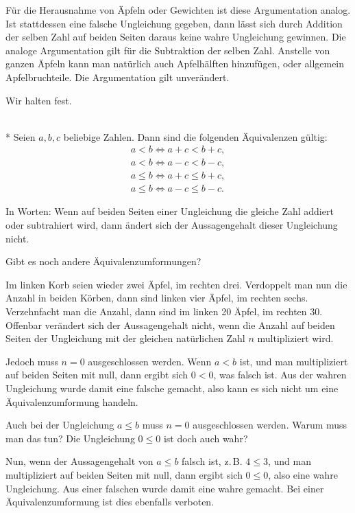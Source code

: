 Für die Herausnahme von Äpfeln oder Gewichten ist diese Argumentation
analog. Ist stattdessen eine falsche Ungleichung gegeben,
dann lässt sich durch Addition der selben Zahl auf beiden Seiten
daraus keine wahre Ungleichung gewinnen. Die analoge Argumentation
gilt für die Subtraktion der selben Zahl. Anstelle von ganzen
Äpfeln kann man natürlich auch Apfelhälften hinzufügen, oder
allgemein Apfelbruchteile. Die Argumentation gilt unverändert.

Wir halten fest. 

\begin{Satz}\mbox{}\\*
Seien $a,b,c$ beliebige Zahlen. Dann sind die folgenden
Äquivalenzen gültig:
\begin{gather}
\label{lt-add} a<b\iff a+c<b+c,\\
\label{lt-sub} a<b\iff a-c<b-c,\\
\label{le-add} a\le b\iff a+c\le b+c,\\
\label{le-sub} a\le b\iff a-c\le b-c.
\end{gather}
\end{Satz}

\noindent
In Worten: Wenn auf beiden Seiten einer Ungleichung die gleiche
Zahl addiert oder subtrahiert wird, dann ändert sich der
Aussagengehalt dieser Ungleichung nicht.

Gibt es noch andere Äquivalenzumformungen?

Im linken Korb seien wieder zwei Äpfel, im rechten drei. Verdoppelt
man nun die Anzahl in beiden Körben, dann sind linken vier Äpfel,
im rechten sechs. Verzehnfacht man die Anzahl, dann sind im linken
20 Äpfel, im rechten 30. Offenbar verändert sich der Aussagengehalt
nicht, wenn die Anzahl auf beiden Seiten der Ungleichung mit
der gleichen natürlichen Zahl $n$ multipliziert wird.

Jedoch muss $n=0$ ausgeschlossen werden. Wenn $a<b$ ist, und man
multipliziert auf beiden Seiten mit null, dann ergibt sich
$0<0$, was falsch ist. Aus der wahren Ungleichung wurde damit eine
falsche gemacht, also kann es sich nicht um eine Äquivalenzumformung
handeln.

Auch bei der Ungleichung $a\le b$ muss $n=0$ ausgeschlossen werden.
Warum muss man das tun? Die Ungleichung $0\le 0$ ist doch auch
wahr?

Nun, wenn der Aussagengehalt von $a\le b$ falsch ist, z.\,B. $4\le 3$,
und man multipliziert auf beiden Seiten mit null, dann ergibt sich
$0\le 0$, also eine wahre Ungleichung. Aus einer falschen wurde damit
eine wahre gemacht. Bei einer Äquivalenzumformung ist dies ebenfalls
verboten.

